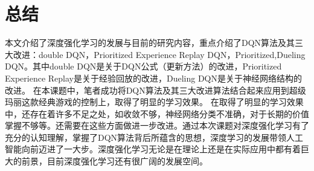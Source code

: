 \chapter{总结}
本文介绍了深度强化学习的发展与目前的研究内容，重点介绍了DQN算法及其三大改进：double DQN，Prioritized Experience Replay DQN，Prioritized,Dueling DQN。其中double DQN是关于DQN公式（更新方法）的改进，Prioritized Experience Replay是关于经验回放的改进，Dueling DQN是关于神经网络结构的改进。
在本课题中，笔者成功将DQN算法及其三大改进算法结合起来应用到超级玛丽这款经典游戏的控制上，取得了明显的学习效果。
在取得了明显的学习效果中，还存在着许多不足之处，如收敛不够，神经网络分类不准确，对于长期的价值掌握不够等。还需要在这些方面做进一步改进。通过本次课题对深度强化学习有了充分的认知理解，掌握了DQN算法背后所蕴含的思想，深度学习的发展带领人工智能向前迈进了一大步。深度强化学习无论是在理论上还是在实际应用中都有着巨大的前景，目前深度强化学习还有很广阔的发展空间。